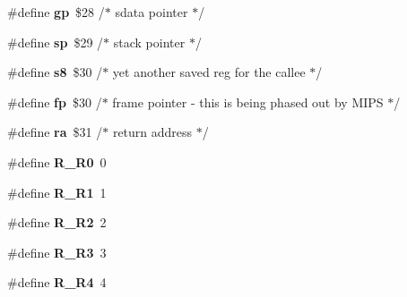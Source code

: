 \begin{DoxyCompactItemize}
\#define {\bfseries gp}~\$28	/$\ast$ sdata pointer $\ast$/
\item 
\mbox{\label{group__RTEMSScoreMIPSSet__iregdef_ga8d40798874dab99986478ef00ff3e297}} 
\#define {\bfseries sp}~\$29	/$\ast$ stack pointer $\ast$/
\item 
\mbox{\label{group__RTEMSScoreMIPSSet__iregdef_ga543c9bcb4e7b83b40dd6ae7a024a63d2}} 
\#define {\bfseries s8}~\$30	/$\ast$ yet another saved reg for the callee $\ast$/
\item 
\mbox{\label{group__RTEMSScoreMIPSSet__iregdef_gae771351dd440a8640270282362e338d0}} 
\#define {\bfseries fp}~\$30	/$\ast$ frame pointer -\/ this is being phased out by M\+I\+PS $\ast$/
\item 
\mbox{\label{group__RTEMSScoreMIPSSet__iregdef_ga6c3a7669c6bdfd66528633d977cdb6b8}} 
\#define {\bfseries ra}~\$31	/$\ast$ return address $\ast$/
\item 
\mbox{\label{group__RTEMSScoreMIPSSet__iregdef_ga55d6b90673e428fe3e185bd7330056e0}} 
\#define {\bfseries R\+\_\+\+R0}~0
\item 
\mbox{\label{group__RTEMSScoreMIPSSet__iregdef_gaf31175ef074a8cccfd9406fab16f3700}} 
\#define {\bfseries R\+\_\+\+R1}~1
\item 
\mbox{\label{group__RTEMSScoreMIPSSet__iregdef_ga94e918ba53f50ad2a71fbbd6ab9bd177}} 
\#define {\bfseries R\+\_\+\+R2}~2
\item 
\mbox{\label{group__RTEMSScoreMIPSSet__iregdef_ga9f85e89508d71429c0050e5152b32661}} 
\#define {\bfseries R\+\_\+\+R3}~3
\item 
\mbox{\label{group__RTEMSScoreMIPSSet__iregdef_gaae6fbc698a64d57a1b14046c522f6880}} 
\#define {\bfseries R\+\_\+\+R4}~4
\item 
\mbox{\label{group__RTEMSScoreMIPSSet__iregdef_ga565ff632e4f2de167b7e769193865b75}} 

\end{DoxyCompactItemize}
